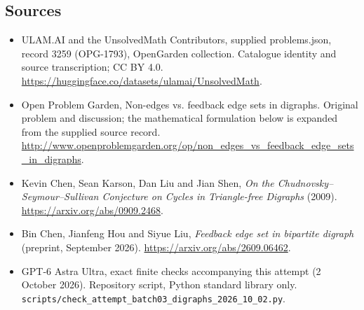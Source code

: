 \documentclass[11pt,a4paper]{article}
\begin{document}
\subsection{Sources}
\begin{itemize}
\item[S1] ULAM.AI and the UnsolvedMath Contributors, supplied problems.json, record 3259 (OPG-1793), OpenGarden collection. Catalogue identity and source transcription; CC BY 4.0.
\url{https://huggingface.co/datasets/ulamai/UnsolvedMath}.
\item[S2] Open Problem Garden, Non-edges vs. feedback edge sets in digraphs. Original problem and discussion; the mathematical formulation below is expanded from the supplied source record.
\url{http://www.openproblemgarden.org/op/non_edges_vs_feedback_edge_sets_in_digraphs}.
\item[S3] Kevin Chen, Sean Karson, Dan Liu and Jian Shen, \emph{On the Chudnovsky--Seymour--Sullivan Conjecture on Cycles in Triangle-free Digraphs} (2009). \url{https://arxiv.org/abs/0909.2468}.
\item[S4] Bin Chen, Jianfeng Hou and Siyue Liu, \emph{Feedback edge set in bipartite digraph} (preprint, September 2026). \url{https://arxiv.org/abs/2609.06462}.
\item[S9] GPT-6 Astra Ultra, exact finite checks accompanying this attempt (2 October 2026). Repository script, Python standard library only. \texttt{scripts/check\_attempt\_batch03\_digraphs\_2026\_10\_02.py}.
\end{itemize}
\end{document}
